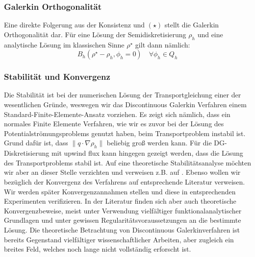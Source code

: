 \subsubsection{Galerkin Orthogonalität}
Eine direkte Folgerung aus der Konsistenz und $ (\star) $ stellt die Galerkin Orthogonalität dar. Für eine Lösung der Semidiskretisierung $ \rho_h $ und eine analytische Lösung im klassischen Sinne $ \rho^{\star} $ gilt dann nämlich:
\[
 B_h(\rho^{\star}-\rho_h,\phi_h = 0) \quad \forall \phi_h \in Q_h
\]
\subsubsection{Stabilität und Konvergenz}
Die Stabilität ist bei der numerischen Lösung der Transportgleichung einer der wesentlichen Gründe, weswegen wir das Discontinuous Galerkin Verfahren einem Standard-Finite-Elemente-Ansatz vorziehen. Es zeigt sich nämlich, dass ein normales Finite Elemente Verfahren, wie wir es zuvor bei der Lösung des Potentialströmungsproblems genutzt haben, beim Transportproblem instabil ist. Grund dafür ist, dass $ \lVert q \cdot \nabla \rho_h \rVert $ beliebig groß werden kann. Für die DG-Diskretisierung mit upwind flux kann hingegen gezeigt werden, dass die Lösung des Transportproblems stabil ist. Auf eine theoretische Stabilitätsanalyse möchten wir aber an dieser Stelle verzichten und verweisen z.B. auf \cite{Har08b}.
Ebenso wollen wir bezüglich der Konvergenz des Verfahrens auf entsprechende Literatur verweisen. Wir werden später Konvergenzannahmen stellen und diese in entsprechenden Experimenten verifizieren. In der Literatur finden sich aber auch theoretische Konvergenzbeweise, meist unter Verwendung vielfältiger funktionalanalytischer Grundlagen und unter gewissen Regularitätsvoraussetzungen an die bestimmte Lösung. Die theoretische Betrachtung von Discontinuous Galerkinverfahren ist bereits Gegenstand vielfältiger wissenschaftlicher Arbeiten, aber zugleich ein breites Feld, welches noch lange nicht vollständig erforscht ist. \\





